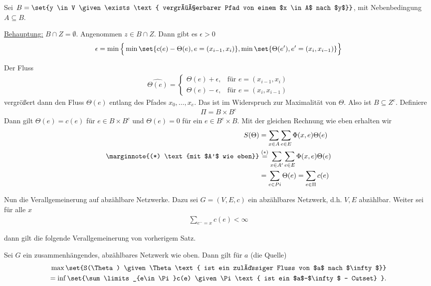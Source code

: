 \begin{beweis}
	Sei $B= \set{y \in V \given \exists \text{ vergrößerbarer Pfad von einem $x \in A$ nach $y$}}$, mit Nebenbedingung $A\subseteq B$.
	
	\underline{Behauptung:} $B \cap Z = \emptyset$. Angenommen $z \in B \cap Z$. Dann gibt es $\epsilon > 0$
	\begin{align}
		\epsilon = \min\Big\{\min\set{c(e) -\Theta(e), e = (x_{i-1},x_i)}, \min\set{\Theta(e'), e' = (x_i,x_{i-1})}\Big\}
	\end{align}
	
	Der Fluss \begin{align}
		\hat{\Theta(e)} = 
			\begin{cases}
				\Theta(e) + \epsilon, & \text{für } e = (x_{i-1},x_i)\\
 				\Theta(e) - \epsilon, & \text{für } e = (x_i,x_{i-1})
			\end{cases}
	\end{align}
	vergrößert dann den Fluss $\Theta(e)$ entlang des Pfades $x_0, \dots, x_e$. Das ist im Widerspruch zur Maximalität von $\Theta$. Also ist $B \subseteq Z^c$. Definiere
	\begin{align}
		\Pi = B \times B^c%
	\end{align} 
	Dann gilt $\Theta(e) = c(e)$ für $e \in B \times B^c$ und $\Theta(e) = 0$ für ein $e \in B^c \times B$. Mit der gleichen Rechnung wie eben erhalten wir 
	\begin{align} 
		S(\Theta) &= \sum\limits_{x\in A} \sum\limits_{e \in E} \Phi(x,e) \Theta(e)\\ \marginnote{(*) \text{mit $A'$ wie eben}}
				&\overset{(*)}{=} \sum\limits_{x \in A'} \sum\limits_{e \in E} \Phi(x,e) \Theta(e) \\
				&= \sum\limits_{e \in Pi}\Theta(e) = \sum\limits_{e \in \Pi}c(e) 
	\end{align}
\end{beweis}
Nun die Verallgemeinerung auf abzählbare Netzwerke. Dazu sei $G= (V,E,c)$ ein abzählbares Netzwerk, d.h. $V,E$ abzählbar. Weiter sei für alle $x$ 
\begin{align}
	\sum\limits_{e ^- = x} c(e) < \infty
\end{align}

dann gilt die folgende Verallgemeinerung von  vorherigem Satz. 

\begin{satz}
	Sei $G$ ein zusammenhängendes, abzählbares Netzwerk wie oben. Dann gilt für $a$ (die Quelle)
	\begin{align}
		\max\set{S(\Theta) \given \Theta \text{ ist ein zulässiger Fluss von $a$ nach $\infty$}} \\
		=\inf\set{\sum\limits_{e\in\Pi}c(e) \given \Pi \text{ ist ein $a$--$\infty$ -- Cutset} }.
	\end{align}
\end{satz}


